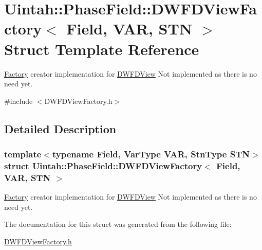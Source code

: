 \hypertarget{structUintah_1_1PhaseField_1_1DWFDViewFactory}{}\section{Uintah\+:\+:Phase\+Field\+:\+:D\+W\+F\+D\+View\+Factory$<$ Field, V\+AR, S\+TN $>$ Struct Template Reference}
\label{structUintah_1_1PhaseField_1_1DWFDViewFactory}


\hyperlink{classUintah_1_1PhaseField_1_1Factory}{Factory} creator implementation for \hyperlink{classUintah_1_1PhaseField_1_1DWFDView}{D\+W\+F\+D\+View} Not implemented as there is no need yet.  




{\ttfamily \#include $<$D\+W\+F\+D\+View\+Factory.\+h$>$}



\subsection{Detailed Description}
\subsubsection*{template$<$typename Field, Var\+Type V\+AR, Stn\+Type S\+TN$>$\newline
struct Uintah\+::\+Phase\+Field\+::\+D\+W\+F\+D\+View\+Factory$<$ Field, V\+A\+R, S\+T\+N $>$}

\hyperlink{classUintah_1_1PhaseField_1_1Factory}{Factory} creator implementation for \hyperlink{classUintah_1_1PhaseField_1_1DWFDView}{D\+W\+F\+D\+View} Not implemented as there is no need yet. 

The documentation for this struct was generated from the following file\+:\begin{DoxyCompactItemize}
\item 
\hyperlink{DWFDViewFactory_8h}{D\+W\+F\+D\+View\+Factory.\+h}\end{DoxyCompactItemize}
